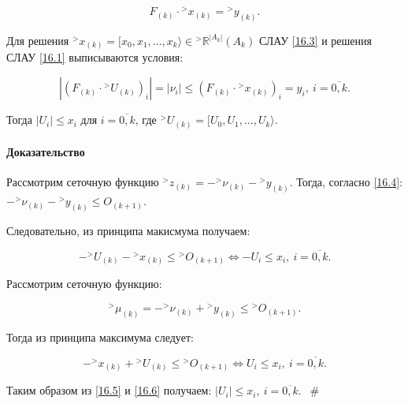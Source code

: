 \documentclass[__main__.tex]{subfiles}
\begin{document}
\begin{equation}\label{16.3}
F_{\left(k\right)} \cdot {}^> x_{\left(k\right)} = {}^> y_{\left(k\right)}.
\end{equation}

Для решения ${}^> x_{\left(k\right)} = [x_0, x_1, ..., x_k\rangle \in {}^> \mathbb{R}^{\left|A_k\right|} \left(A_k\right)$ СЛАУ \ref{16.3} и решения СЛАУ \ref{16.1} выписываются условия:

\begin{equation}\label{16.4}
\left| \left(F_{\left(k\right)} \cdot {}^> U_{\left(k\right)}\right)_i \right| = \left|\nu_i\right| \leq \left(F_{\left(k\right)} \cdot {}^> x_{\left(k\right)}\right)_i = y_i, \ i = \overline{0,k}.
\end{equation}

Тогда $\left|U_i\right| \leq x_i$ для $i = \overline{0,k}$, где ${}^> U_{\left(k\right)} = [ U_0, U_1, ..., U_k \rangle$.

\paragraph{Доказательство}

Рассмотрим сеточную функцию ${}^> z_{\left(k\right)} = - {}^> \nu_{\left(k\right)} - {}^> y_{\left(k\right)}$. Тогда, согласно \ref{16.4}: $- {}^>\nu_{\left(k\right)} - {}^> y_{\left(k\right)}\leq O_{\left(k+1\right)}$. 

Следовательно, из принципа макисмума получаем:

\begin{equation} \label{16.5}
- {}^> U_{\left(k\right)} - {}^> x_{\left(k\right)} \leq {}^> O_{\left(k+1\right)} \Leftrightarrow - U_i \leq x_i, \ i = \overline{0,k}.
\end{equation}

Рассмотрим сеточную функцию:

$$
{}^> \mu_{\left(k\right)} = - {}^> \nu_{\left(k\right)} + {}^> y_{\left(k\right)} \leq {}^> O_{\left(k+1\right)}.
$$

Тогда из принципа максимума следует:

\begin{equation}\label{16.6}
- {}^> x_{\left(k\right)} + {}^> U_{\left(k\right)} \leq {}^> O_{\left(k+1\right)} \Leftrightarrow U_i \leq x_i, \ i= \overline{0,k}.
\end{equation}

Таким образом из \ref{16.5} и \ref{16.6} получаем: $\left|U_i\right| \leq x_i, \ i = \overline{0,k}$. $\ \ \#$
\end{document}

